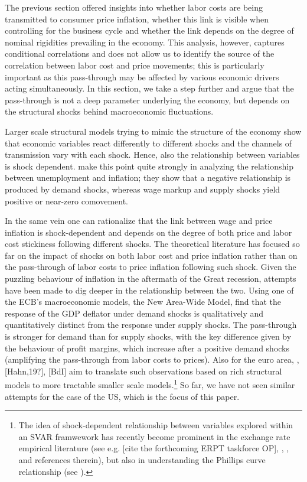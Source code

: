 \documentclass[11pt]{article}
\begin{document}
The previous section offered insights into whether labor costs are being transmitted to consumer price inflation, whether this link is visible when controlling for the business cycle and whether the link depends on the degree of nominal rigidities prevailing in the economy. This analysis, however, captures conditional correlations and does not allow us to identify the source of the correlation between labor cost and price movements; this is particularly important as this pass-through may be affected by various economic drivers acting simultaneously. In this section, we take a step further and argue that the pass-through is not a deep parameter underlying the economy, but depends on the structural shocks behind macroeconomic fluctuations.

Larger scale structural models trying to mimic the structure of the economy show that economic variables react differently to different shocks and the channels of transmission vary with each shock. Hence, also the relationship between variables is shock dependent. \cite{Gali_Smets_Wouters_12} make this point quite strongly in analyzing the relationship between unemployment and inflation; they show that a negative relationship is produced by demand shocks, whereas wage markup and supply shocks yield positive or near-zero comovement. 

In the same vein one can rationalize that the link between wage and price inflation is shock-dependent and depends on the degree of both price and labor cost stickiness following different shocks. The theoretical literature has focused so far on the impact of shocks on both labor cost and price inflation rather than on the pass-through of labor costs to price inflation following such shock. Given the puzzling behaviour of inflation in the aftermath of the Great recession, attempts have been made to dig deeper in the relationship between the two. Using one of the ECB's macroeconomic models, the New Area-Wide Model, \cite{Hahn_Gumiel_18} find that the response of the GDP deflator under demand shocks is qualitatively and quantitatively distinct from the response under supply shocks. The pass-through is stronger for demand than for supply shocks, with the key difference given by the behaviour of profit margins, which increase after a positive demand shocks (amplifying the pass-through from labor costs to prices). Also for the euro area, \cite{BCV19}, [Hahn,19?], [BdI] aim to translate such observations based on rich structural models to more tractable smaller scale models.\footnote{The idea of shock-dependent relationship between variables explored within an SVAR framwework has recently become prominent in the exchange rate empirical literature (see e.g. [cite the forthcoming ERPT taskforce OP], \cite{Forbes_2018}, \cite{Rincon-Castro_18}, \cite{Comunale_Kunovac_2017} and references therein), but also in understanding the Phillips curve relationship (see \cite{Gali_Gambetti_19}).} So far, we have not seen similar attempts for the case of the US, which is the focus of this paper.
\end{document}
